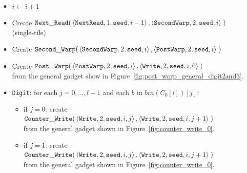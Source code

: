 \begin{itemize}
    \item $i \gets i + 1$

    \item Create
    $\begin{aligned}[t]
            {\tt Next\_Read}(&\left\langle {\tt NextRead},   1, {\tt seed}, i - 1\right\rangle,
                       \left\langle {\tt SecondWarp}, 2, {\tt seed}, i    \right\rangle \;)
    \end{aligned}$\\ (single-tile)

    \item Create
    $\begin{aligned}[t]
        {\tt Second\_Warp}(&\left\langle {\tt SecondWarp}, 2, {\tt seed}, i \right\rangle,
                     \left\langle {\tt PostWarp},   2, {\tt seed}, i \right\rangle \;)
    \end{aligned}$

    \item Create
    $\begin{aligned}[t]
        {\tt Post\_Warp}(&\left\langle {\tt PostWarp}, 2, {\tt seed}, i    \right\rangle,
                   \left\langle {\tt Write},    2, {\tt seed}, i, 0 \right\rangle \;)
    \end{aligned}$\\ from the general gadget show in Figure~\ref{fig:post_warp_general_digit2and3}.

    \item {\tt Digit}: for each $j=0,\ldots,l-1$ and each $b$ in $bin(C_0[i])[j]$:
    \begin{itemize}
        \item if $j = 0$: create
        $\begin{aligned}[t]
            {\tt Counter\_Write}(&\left\langle {\tt Write}, 2, {\tt seed}, i, j \right\rangle, \left\langle {\tt Write}, 2, {\tt seed}, i, j + 1 \right\rangle \;)
        \end{aligned}$\\from the general gadget shown in Figure~\ref{fig:counter_write_0}.

        \item if $j = 1$: create
        $\begin{aligned}[t]
            {\tt Counter\_Write}(&\left\langle {\tt Write}, 2, {\tt seed}, i, j \right\rangle, \left\langle {\tt Write}, 2, {\tt seed}, i, j + 1 \right\rangle \;)
        \end{aligned}$\\from the general gadget shown in Figure~\ref{fig:counter_write_0}.


\end{itemize}
\end{itemize}
